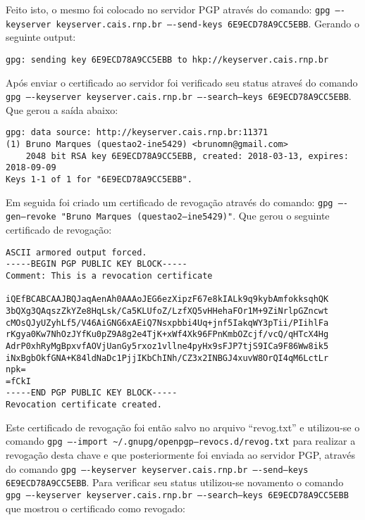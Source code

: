 \documentclass[
    article,            %
    11pt,               %
    oneside,            %
    a4paper,            %
    english,            %
    brazil,             %
    sumario=tradicional,
    ]{abntex2}
\begin{document}
Feito isto, o mesmo foi colocado no servidor PGP através do comando: \texttt{gpg ----keyserver keyserver.cais.rnp.br ----send-keys 6E9ECD78A9CC5EBB}. Gerando o seguinte output:

\begin{Verbatim}[frame=single, commandchars=\\\{\}, fontsize=\footnotesize]
gpg: sending key 6E9ECD78A9CC5EBB to hkp://keyserver.cais.rnp.br
\end{Verbatim}

Após enviar o certificado ao servidor foi verificado seu status atraveś do comando \texttt{gpg ----keyserver keyserver.cais.rnp.br ----search--keys 6E9ECD78A9CC5EBB}. Que gerou a saída abaixo:

\begin{Verbatim}[frame=single, commandchars=\\\{\}, fontsize=\footnotesize]
gpg: data source: http://keyserver.cais.rnp.br:11371
(1) Bruno Marques (questao2-ine5429) <brunomn@gmail.com>
    2048 bit RSA key 6E9ECD78A9CC5EBB, created: 2018-03-13, expires: 2018-09-09
Keys 1-1 of 1 for "6E9ECD78A9CC5EBB".
\end{Verbatim}

Em seguida foi criado um certificado de revogação através do comando: \texttt{gpg ----gen--revoke "Bruno Marques (questao2--ine5429)"}. Que gerou o seguinte certificado de revogação:

\begin{Verbatim}[frame=single, commandchars=\\\{\}, fontsize=\footnotesize]
ASCII armored output forced.
-----BEGIN PGP PUBLIC KEY BLOCK-----
Comment: This is a revocation certificate

iQEfBCABCAAJBQJaqAenAh0AAAoJEG6ezXipzF67e8kIALk9q9kybAmfokksqhQK
3bQXg3QAqszZkYZe8HqLsk/Ca5KLUfoZ/LzfXQ5vHHehaFOr1M+9ZiNrlpGZncwt
cMOsQJyUZyhLf5/V46AiGNG6xAEiQ7Nsxpbbi4Uq+jnf5IakqWY3pTii/PIihlFa
rKgya0Kw7NhOzJYfKu0pZ9A8g2e4TjK+xWf4Xk96FPnKmbOZcjf/vcQ/qHTcX4Hg
AdrP0xhRyMgBpxvfAOVjUanGy5rxoz1vllne4pyHx9sFJP7tjS9ICa9F86Ww8ik5
iNxBgbOkfGNA+K84ldNaDc1PjjIKbChINh/CZ3x2INBGJ4xuvW8OrQI4qM6LctLr
npk=
=fCkI
-----END PGP PUBLIC KEY BLOCK-----
Revocation certificate created.
\end{Verbatim}

Este certificado de revogação foi então salvo no arquivo ``revog.txt'' e utilizou-se o comando \texttt{gpg ----import  \textasciitilde /.gnupg/openpgp--revocs.d/revog.txt} para realizar a revogação desta chave e que posteriormente foi enviada ao servidor PGP, através do comando \texttt{gpg ----keyserver keyserver.cais.rnp.br ----send--keys 6E9ECD78A9CC5EBB}. Para verificar seu status utilizou-se novamento o comando \texttt{gpg ----keyserver keyserver.cais.rnp.br ----search--keys 6E9ECD78A9CC5EBB} que mostrou o certificado como revogado:
\end{document}
